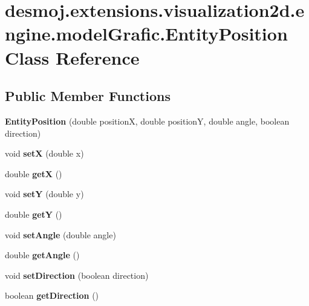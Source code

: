 \section{desmoj.\-extensions.\-visualization2d.\-engine.\-model\-Grafic.\-Entity\-Position Class Reference}
\label{classdesmoj_1_1extensions_1_1visualization2d_1_1engine_1_1model_grafic_1_1_entity_position}
\subsection*{Public Member Functions}
\begin{DoxyCompactItemize}
\item 
{\bf Entity\-Position} (double position\-X, double position\-Y, double angle, boolean direction)
\item 
void {\bfseries set\-X} (double x)\label{classdesmoj_1_1extensions_1_1visualization2d_1_1engine_1_1model_grafic_1_1_entity_position_ab2cc69d15398335aa36fd96c6b7f7dd6}

\item 
double {\bfseries get\-X} ()\label{classdesmoj_1_1extensions_1_1visualization2d_1_1engine_1_1model_grafic_1_1_entity_position_aa191ed29a15903c068db7722f0c67cc9}

\item 
void {\bfseries set\-Y} (double y)\label{classdesmoj_1_1extensions_1_1visualization2d_1_1engine_1_1model_grafic_1_1_entity_position_a60a8c42fb0a9f3522e0996c869efe13a}

\item 
double {\bfseries get\-Y} ()\label{classdesmoj_1_1extensions_1_1visualization2d_1_1engine_1_1model_grafic_1_1_entity_position_ab4f61e3597070c8cfed842721b7a3bf1}

\item 
void {\bfseries set\-Angle} (double angle)\label{classdesmoj_1_1extensions_1_1visualization2d_1_1engine_1_1model_grafic_1_1_entity_position_a52e8b4d31afcfd4c493e4b69980e4a80}

\item 
double {\bfseries get\-Angle} ()\label{classdesmoj_1_1extensions_1_1visualization2d_1_1engine_1_1model_grafic_1_1_entity_position_a8c96c96df0757e3c67707a9f844f885a}

\item 
void {\bfseries set\-Direction} (boolean direction)\label{classdesmoj_1_1extensions_1_1visualization2d_1_1engine_1_1model_grafic_1_1_entity_position_a02822496b134f4e86dfba28818d4cefc}

\item 
boolean {\bfseries get\-Direction} ()\label{classdesmoj_1_1extensions_1_1visualization2d_1_1engine_1_1model_grafic_1_1_entity_position_ad9e04f03da5d07e1b3c5887cc1b6c002}

\end{DoxyCompactItemize}


